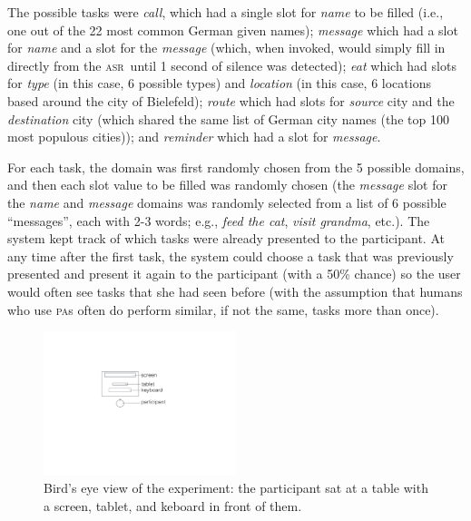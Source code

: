 \documentclass[11pt]{article}
\newcommand{\asr}[0]{\textsc{asr}}
\newcommand{\pa}[0]{\textsc{pa}}
\begin{document}
The possible tasks were \emph{call}, which had a single slot for \emph{name} to be filled (i.e., one out of the 22 most common German given names); \emph{message} which had a slot for \emph{name} and a slot for the \emph{message} (which, when invoked, would simply fill in directly from the \asr\ until 1 second of silence was detected); \emph{eat} which had slots for \emph{type} (in this case, 6 possible types) and \emph{location} (in this case, 6 locations based around the city of Bielefeld); \emph{route} which had slots for \emph{source} city and the \emph{destination} city (which shared the same list of German city names (the top 100 most populous cities)); and \emph{reminder} which had a slot for \emph{message}. 


For each task, the domain was first randomly chosen from the 5 possible domains, and then each slot value to be filled was randomly chosen (the \emph{message} slot for the \emph{name} and \emph{message} domains was randomly selected from a list of 6 possible ``messages'', each with 2-3 words; e.g., \emph{feed the cat}, \emph{visit grandma}, etc.). The system kept track of which tasks were already presented to the participant. At any time after the first task, the system could choose a task that was previously presented and present it again to the participant (with a 50\% chance) so the user would often see tasks that she had seen before (with the assumption that humans who use \pa s often do perform similar, if not the same, tasks more than once). 

\begin{figure}[ht]
  \centering
      \includegraphics[width=0.5\textwidth]{figures/dataview.pdf}	
      \caption{Bird's eye view of the experiment: the participant sat at a table with a screen, tablet, and keboard in front of them. \label{fig:dataview}}
\end{figure}
\end{document}
